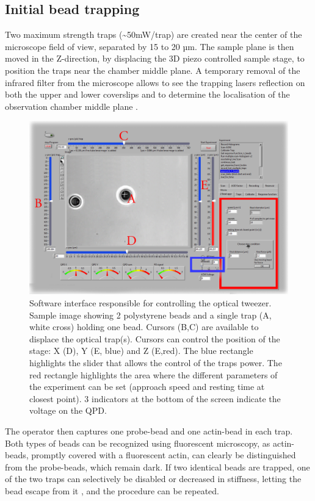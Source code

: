 \documentclass[A4paperpaper,11pt,english]{sphinxmanual}
\begin{document}
\subsection{Initial bead trapping}
\label{parts/part2:initial-bead-trapping}
Two maximum strength traps (\textasciitilde{}50mW/trap) are created near the center of the
microscope field of view, separated by 15 to 20 µm. The sample plane is then moved in
the Z-direction, by displacing the 3D piezo controlled sample stage, to position the traps
near the chamber middle plane. A temporary removal of the infrared filter
from the microscope allows to see the trapping lasers reflection on both the
upper and lower coverslips and to determine the localisation of the observation chamber middle plane
.
\begin{figure}[htbp]
\centering
\capstart

\includegraphics[width=0.900\linewidth]{frontend.png}
\caption{Software interface responsible for controlling the optical tweezer.  Sample
image showing 2 polystyrene beads and a single trap (A, white cross) holding one bead.
Cursors (B,C) are available to displace the optical trap(s).  Cursors can
control the position of the stage: X (D), Y (E, blue) and Z (E,red).
The blue rectangle highlights the slider that allows the control of the traps power.  The red
rectangle highlights the area where the different parameters of the experiment
can be set (approach speed and resting time at closest point). 3 indicators at
the bottom of the screen indicate the voltage on the QPD.}\label{parts/part2:fig-frontend}\end{figure}

The operator then captures one probe-bead and one actin-bead in each
trap.  Both types of beads can be recognized using fluorescent microscopy, as
actin-beads, promptly covered with a fluorescent actin,
can clearly be distinguished from the probe-beads, which remain dark.
If two identical beads are trapped, one of the two traps can selectively
be disabled or decreased in stiffness, letting the bead escape from it ,
and the procedure can be repeated.
\end{document}

